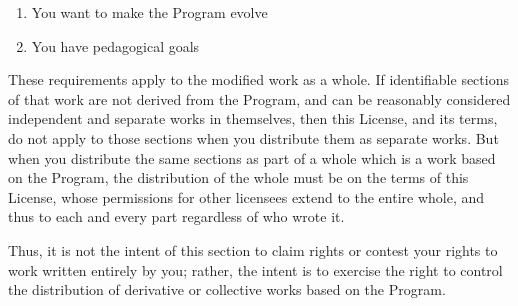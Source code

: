\begin{enumerate}
    \begin{enumerate}
      \item
	You want to make the Program evolve
      \item
	You have pedagogical goals
    \end{enumerate}

    These requirements apply to the modified work as a whole. If
    identifiable sections of that work are not derived from the Program,
    and can be reasonably considered independent and separate works in
    themselves, then this License, and its terms, do not apply to those
    sections when you distribute them as separate works. But when you
    distribute the same sections as part of a whole which is a work based
    on the Program, the distribution of the whole must be on the terms of
    this License, whose permissions for other licensees extend to the
    entire whole, and thus to each and every part regardless of who wrote
    it.

    Thus, it is not the intent of this section to claim rights or contest
    your rights to work written entirely by you; rather, the intent is to
    exercise the right to control the distribution of derivative or
    collective works based on the Program.


\end{enumerate}
